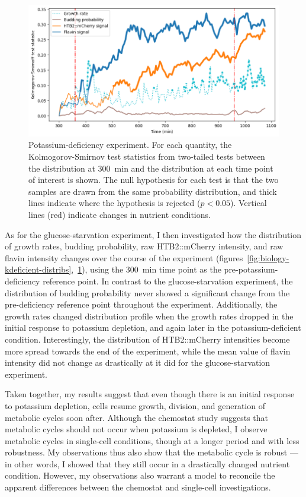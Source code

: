 \begin{figure}
  \centering
  \includegraphics[width=\textwidth]{613_ks_highlight}
  \caption{
    Potassium-deficiency experiment.
    For each quantity, the Kolmogorov-Smirnov test statistics from two-tailed tests between the distribution at \SI{300}{\minute} and the distribution at each time point of interest is shown.
    The null hypothesis for each test is that the two samples are drawn from the same probability distribution, and thick lines indicate where the hypothesis is rejected ($p < 0.05$).
    Vertical lines (red) indicate changes in nutrient conditions.
  }
  \label{fig:biology-kdeficient-ks}
\end{figure}

As for the glucose-starvation experiment, I then investigated how the distribution of growth rates, budding probability, raw HTB2::mCherry intensity, and raw flavin intensity changes over the course of the experiment (figures~\ref{fig:biology-kdeficient-distribs},~\ref{fig:biology-kdeficient-ks}), using the \SI{300}{\minute} time point as the pre-potassium-deficiency reference point.
In contrast to the glucose-starvation experiment, the distribution of budding probability never showed a significant change from the pre-deficiency reference point throughout the experiment.
Additionally, the growth rates changed distribution profile when the growth rates dropped in the initial response to potassium depletion, and again later in the potassium-deficient condition.
Interestingly, the distribution of HTB2::mCherry intensities become more spread towards the end of the experiment, while the mean value of flavin intensity did not change as drastically at it did for the glucose-starvation experiment.

Taken together, my results suggest that even though there is an initial response to potassium depletion, cells resume growth, division, and generation of metabolic cycles soon after.
Although the chemostat study suggests that metabolic cycles should not occur when potassium is depleted, I observe metabolic cycles in single-cell conditions, though at a longer period and with less robustness.
My observations thus also show that the metabolic cycle is robust --- in other words, I showed that they still occur in a drastically changed nutrient condition.
However, my observations also warrant a model to reconcile the apparent differences between the chemostat and single-cell investigations.


